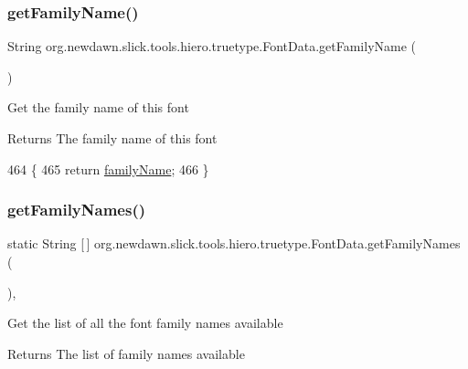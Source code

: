 \subsubsection{\texorpdfstring{get\+Family\+Name()}{getFamilyName()}}
{\footnotesize\ttfamily String org.\+newdawn.\+slick.\+tools.\+hiero.\+truetype.\+Font\+Data.\+get\+Family\+Name (\begin{DoxyParamCaption}{ }\end{DoxyParamCaption})\hspace{0.3cm}{\ttfamily [inline]}}

Get the family name of this font

\begin{DoxyReturn}{Returns}
The family name of this font 
\end{DoxyReturn}

\begin{DoxyCode}
464                                   \{
465         \textcolor{keywordflow}{return} \mbox{\hyperlink{classorg_1_1newdawn_1_1slick_1_1tools_1_1hiero_1_1truetype_1_1_font_data_a287c606f09e3581f4eaea1b7bd81ded1}{familyName}};
466     \}
\end{DoxyCode}
\mbox{\label{classorg_1_1newdawn_1_1slick_1_1tools_1_1hiero_1_1truetype_1_1_font_data_aeec2cc305bdef13bcdffd23194549346}} 
\subsubsection{\texorpdfstring{get\+Family\+Names()}{getFamilyNames()}}
{\footnotesize\ttfamily static String \mbox{[}$\,$\mbox{]} org.\+newdawn.\+slick.\+tools.\+hiero.\+truetype.\+Font\+Data.\+get\+Family\+Names (\begin{DoxyParamCaption}{ }\end{DoxyParamCaption})\hspace{0.3cm}{\ttfamily [inline]}, {\ttfamily [static]}}

Get the list of all the font family names available

\begin{DoxyReturn}{Returns}
The list of family names available 
\end{DoxyReturn}

